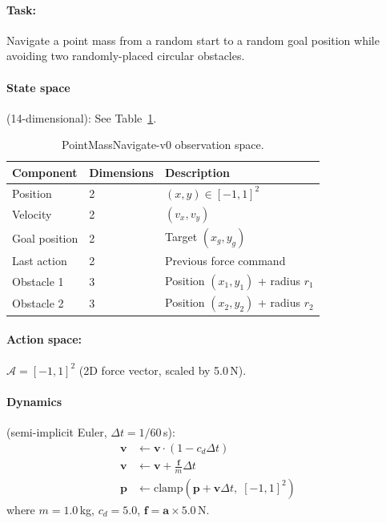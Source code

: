 \documentclass[11pt,a4paper]{article}
\newcommand{\cA}{\mathcal{A}}
\newcommand{\bvf}{\mathbf{v}}
\newcommand{\bpf}{\mathbf{p}}
\newcommand{\bff}{\mathbf{f}}
\newcommand{\ba}{\mathbf{a}}
\begin{document}
\paragraph{Task:} Navigate a point mass from a random start to a random goal position while avoiding two randomly-placed circular obstacles.

\paragraph{State space} (14-dimensional): See Table~\ref{tab:pm_obs}.

\begin{table}[htbp]
  \centering
  \caption{PointMassNavigate-v0 observation space.}
  \label{tab:pm_obs}
  \begin{tabular}{@{}lll@{}}
    \toprule
    \textbf{Component} & \textbf{Dimensions} & \textbf{Description} \\
    \midrule
    Position       & 2 & $(x, y) \in [-1, 1]^2$ \\
    Velocity       & 2 & $(v_x, v_y)$ \\
    Goal position  & 2 & Target $(x_g, y_g)$ \\
    Last action    & 2 & Previous force command \\
    Obstacle 1     & 3 & Position $(x_1, y_1)$ + radius $r_1$ \\
    Obstacle 2     & 3 & Position $(x_2, y_2)$ + radius $r_2$ \\
    \bottomrule
  \end{tabular}
\end{table}

\paragraph{Action space:} $\cA = [-1, 1]^2$ (2D force vector, scaled by 5.0\,N).

\paragraph{Dynamics} (semi-implicit Euler, $\Delta t = 1/60$\,s):
\begin{align}
  \bvf &\leftarrow \bvf \cdot (1 - c_d \Delta t) \\
  \bvf &\leftarrow \bvf + \frac{\bff}{m} \Delta t \\
  \bpf &\leftarrow \text{clamp}\!\left(\bpf + \bvf \Delta t,\; [-1, 1]^2\right)
\end{align}
where $m = 1.0$\,kg, $c_d = 5.0$, $\bff = \ba \times 5.0$\,N.
\end{document}
